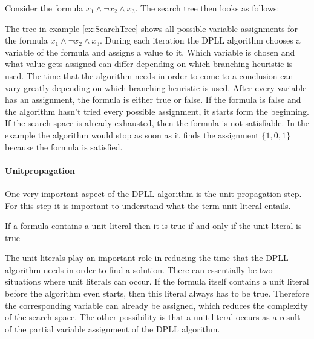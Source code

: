 \begin{leftbar}
\label{ex:SearchTree}
Consider the formula $x_1 \wedge \neg x_2 \wedge x_3$. The search tree then looks as follows:\\
\centering
{}
\end{leftbar}

The tree in example \ref{ex:SearchTree} shows all possible variable assignments for the formula $x_1 \wedge \neg x_2 \wedge x_3$. During each iteration the DPLL algorithm chooses a variable of the formula and assigns a value to it. Which variable is chosen and what value gets assigned can differ depending on which branching heuristic is used. The time that the algorithm needs in order to come to a conclusion can vary greatly depending on which branching heuristic is used. After every variable has an assignment, the formula is either true or false. If the formula is false and the algorithm hasn't tried every possible assignment, it starts form the beginning. If the search space is already exhausted, then the formula is not satisfiable. In the example the algorithm would stop as soon as it finds the assignment $\{1,0,1\}$ because the formula is satisfied.

\paragraph{Unitpropagation}
One very important aspect of the DPLL algorithm is the unit propagation step. For this step it is important to understand what the term unit literal entails.
\begin{leftbar}
If a formula contains a unit literal then it is true if and only if the unit literal is true
\end{leftbar}
The unit literals play an important role in reducing the time that the DPLL algorithm needs in order to find a solution. There can essentially be two situations where unit literals can occur. If the formula itself contains a unit literal before the algorithm even starts, then this literal always has to be true. Therefore the corresponding variable can already be assigned, which reduces the complexity of the search space. The other possibility is that a unit literal occurs as a result of the partial variable assignment of the DPLL algorithm.

